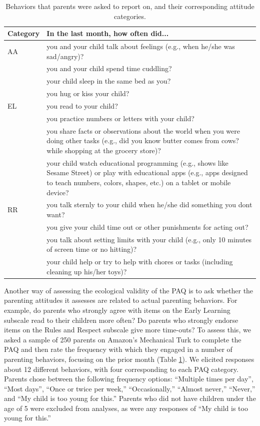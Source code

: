 \documentclass[man]{apa6}
\theoremstyle{definition}
\theoremstyle{definition}
\theoremstyle{definition}
\theoremstyle{remark}
\begin{document}
\begin{table}

\caption{\label{tab:behavesents}Behaviors that parents were asked to report on, and their corresponding attitude categories.}
\centering
\begin{tabular}[t]{l|>{\raggedright\arraybackslash}p{35em}}
\hline
Category & In the last month, how often did...\\
\hline
AA & you and your child talk about feelings (e.g., when he/she was sad/angry)?\\
\hline
 & you and your child spend time cuddling?\\
\hline
 & your child sleep in the same bed as you?\\
\hline
 & you hug or kiss your child?\\
\hline
EL & you read to your child?\\
\hline
 & you practice numbers or letters with your child?\\
\hline
 & you share facts or observations about the world when you were doing other tasks (e.g., did you know butter comes from cows? while shopping at the grocery store)?\\
\hline
 & your child watch educational programming (e.g., shows like Sesame Street) or play with educational apps (e.g., apps designed to teach numbers, colors, shapes, etc.) on a tablet or mobile device?\\
\hline
RR & you talk sternly to your child when he/she did something you dont want?\\
\hline
 & you give your child time out or other punishments for acting out?\\
\hline
 & you talk about setting limits with your child (e.g., only 10 minutes of screen time or no hitting)?\\
\hline
 & your child help or try to help with chores or tasks (including cleaning up his/her toys)?\\
\hline
\end{tabular}
\end{table}

Another way of assessing the ecological validity of the PAQ is to ask
whether the parenting attitudes it assesses are related to actual
parenting behaviors. For example, do parents who strongly agree with
items on the Early Learning subscale read to their children more often?
Do parents who strongly endorse items on the Rules and Respect subscale
give more time-outs? To assess this, we asked a sample of 250 parents on
Amazon's Mechanical Turk to complete the PAQ and then rate the frequency
with which they engaged in a number of parenting behaviors, focusing on
the prior month (Table \ref{tab:behavesents}). We elicited responses
about 12 different behaviors, with four corresponding to each PAQ
category. Parents chose between the following frequency options:
\enquote{Multiple times per day}, \enquote{Most days}, \enquote{Once or
twice per week,} \enquote{Occasionally,} \enquote{Almost never,}
\enquote{Never,} and \enquote{My child is too young for this.} Parents
who did not have children under the age of 5 were excluded from
analyses, as were any responses of \enquote{My child is too young for
this.}
\end{document}

